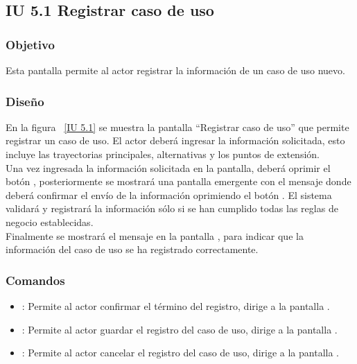 \subsection{IU 5.1 Registrar caso de uso}

\subsubsection{Objetivo}
	
	Esta pantalla permite al actor registrar la información de un caso de uso nuevo.

\subsubsection{Diseño}

    En la figura ~\ref{IU 5.1} se muestra la pantalla ``Registrar caso de uso'' que permite registrar un caso de uso. El actor deberá ingresar la información solicitada, 
    esto incluye las trayectorias principales, alternativas y los puntos de extensión.\\
    
    
    Una vez ingresada la información solicitada en la pantalla, deberá oprimir el botón 
    , posteriormente se mostrará una pantalla emergente 
    con el mensaje  donde deberá confirmar el envío de la información oprimiendo el botón . 
    El sistema validará y registrará la información sólo si se han cumplido todas las reglas de negocio establecidas.  \\
    
    Finalmente se mostrará el mensaje  en la pantalla , para indicar que la información del caso de uso
    se ha registrado correctamente.        


    


\subsubsection{Comandos}
\begin{itemize}
	\item {}: Permite al actor confirmar el término del registro, dirige a la pantalla .
	\item {}: Permite al actor guardar el registro del caso de uso, dirige a la pantalla .
	\item {}: Permite al actor cancelar el registro del caso de uso, dirige a la pantalla .
\end{itemize}

